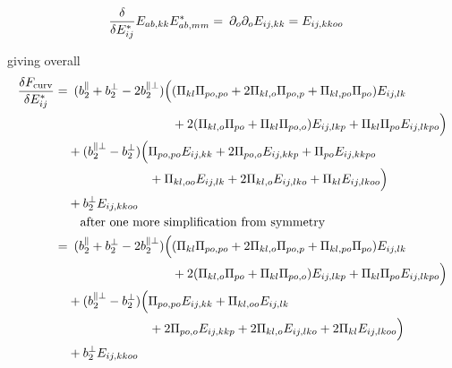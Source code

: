 \documentclass[11pt]{article}
\begin{document}
\begin{align}
    \fdv{E_{ij}^*} E_{ab,kk}E_{ab,mm}^* =&\enspace \pp_o\pp_o E_{ij,kk} = E_{ij,kkoo}
\end{align}

giving overall
\begin{align}
    \fdv{F_\text{curv}}{E_{ij}^*} =&\enspace (b_2^\parallel + b_2^\perp - 2b_2^{\parallel\perp}) \Bigl( (\Pi_{kl}\Pi_{po,po} + 2\Pi_{kl,o}\Pi_{po,p} + \Pi_{kl,po}\Pi_{po})E_{ij,lk} \\
    &\phantom{\enspace (b_2^\parallel + b_2^\perp - 2b_2^{\parallel\perp}) \Bigl(}+ 2(\Pi_{kl,o}\Pi_{po} + \Pi_{kl}\Pi_{po,o})E_{ij,lkp} + \Pi_{kl}\Pi_{po}E_{ij,lkpo} \Bigr) \nonumber \\
    &+ (b_2^{\parallel\perp} - b_2^\perp)\Bigl( \Pi_{po,po}E_{ij,kk} + 2\Pi_{po,o}E_{ij,kkp} + \Pi_{po}E_{ij,kkpo} \nonumber \\ 
    &\phantom{\enspace+ (b_2^{\parallel\perp} - b_2^\perp)\Bigl(}+ \Pi_{kl,oo}E_{ij,lk} + 2\Pi_{kl,o}E_{ij,lko} + \Pi_{kl}E_{ij,lkoo} \Bigr) \nonumber \\ 
    &+ b_2^\perp E_{ij,kkoo} \nonumber \\
    &\qq{after one more simplification from symmetry} \nonumber \\
    =&\enspace (b_2^\parallel + b_2^\perp - 2b_2^{\parallel\perp}) \Bigl( (\Pi_{kl}\Pi_{po,po} + 2\Pi_{kl,o}\Pi_{po,p} + \Pi_{kl,po}\Pi_{po})E_{ij,lk} \\
    &\phantom{\enspace (b_2^\parallel + b_2^\perp - 2b_2^{\parallel\perp}) \Bigl(}+ 2(\Pi_{kl,o}\Pi_{po} + \Pi_{kl}\Pi_{po,o})E_{ij,lkp} + \Pi_{kl}\Pi_{po}E_{ij,lkpo} \Bigr) \nonumber \\
    &+ (b_2^{\parallel\perp} - b_2^\perp)\Bigl( \Pi_{po,po}E_{ij,kk} + \Pi_{kl,oo}E_{ij,lk} \nonumber \\ 
    &\phantom{\enspace+ (b_2^{\parallel\perp} - b_2^\perp)\Bigl(}+ 2\Pi_{po,o}E_{ij,kkp} + 2\Pi_{kl,o}E_{ij,lko} + 2\Pi_{kl}E_{ij,lkoo} \Bigr) \nonumber \\ 
    &+ b_2^\perp E_{ij,kkoo} \nonumber
\end{align}
\end{document}
